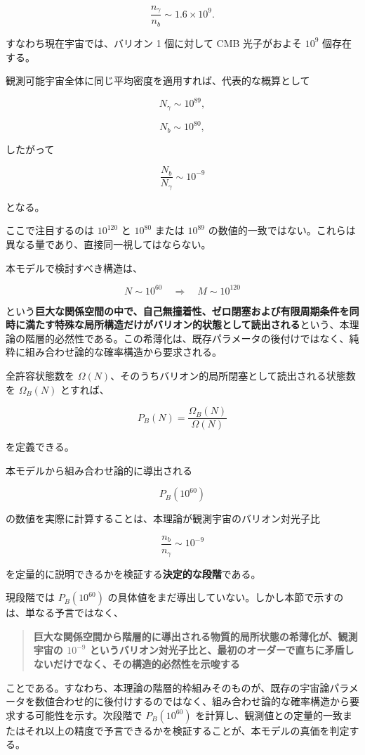 \documentclass[
  a4paper,
]{ltjsarticle}
\begin{document}
\[
\frac{n_\gamma}{n_b}
\sim
1.6\times10^9.
\tag{22}
\]

すなわち現在宇宙では、バリオン 1 個に対して CMB 光子がおよそ \(10^9\)
個存在する。

観測可能宇宙全体に同じ平均密度を適用すれば、代表的な概算として

\[
N_\gamma\sim10^{89},
\]

\[
N_b\sim10^{80},
\]

したがって

\[
\frac{N_b}{N_\gamma}
\sim10^{-9}
\tag{23}
\]

となる。

ここで注目するのは \(10^{120}\) と \(10^{80}\) または \(10^{89}\)
の数値的一致ではない。これらは異なる量であり、直接同一視してはならない。

本モデルで検討すべき構造は、

\[
N\sim10^{60}
\quad\Longrightarrow\quad
M\sim10^{120}
\]

という\textbf{巨大な関係空間の中で、自己無撞着性、ゼロ閉塞および有限周期条件を同時に満たす特殊な局所構造だけがバリオン的状態として読出される}という、本理論の階層的必然性である。この希薄化は、既存パラメータの後付けではなく、純粋に組み合わせ論的な確率構造から要求される。

全許容状態数を
\(\Omega(N)\)、そのうちバリオン的局所閉塞として読出される状態数を
\(\Omega_B(N)\) とすれば、

\[
P_B(N)
=
\frac{\Omega_B(N)}{\Omega(N)}
\tag{24}
\]

を定義できる。

本モデルから組み合わせ論的に導出される

\[
P_B(10^{60})
\]

の数値を実際に計算することは、本理論が観測宇宙のバリオン対光子比

\[
\frac{n_b}{n_\gamma}
\sim10^{-9}
\]

を定量的に説明できるかを検証する\textbf{決定的な段階}である。

現段階では \(P_B(10^{60})\)
の具体値をまだ導出していない。しかし本節で示すのは、単なる予言ではなく、

\begin{quote}
\textbf{巨大な関係空間から階層的に導出される物質的局所状態の希薄化が、観測宇宙の
\(10^{-9}\)
というバリオン対光子比と、最初のオーダーで直ちに矛盾しないだけでなく、その構造的必然性を示唆する}
\end{quote}

ことである。すなわち、本理論の階層的枠組みそのものが、既存の宇宙論パラメータを数値合わせ的に後付けするのではなく、組み合わせ論的な確率構造から要求する可能性を示す。次段階で
\(P_B(10^{60})\)
を計算し、観測値との定量的一致またはそれ以上の精度で予言できるかを検証することが、本モデルの真価を判定する。
\end{document}

